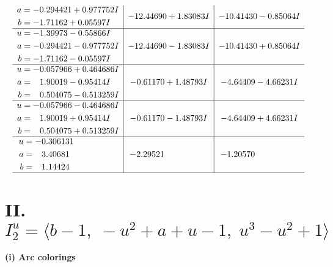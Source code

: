 \documentclass[1p]{elsarticle_modified}
\theoremstyle{definition}
\begin{document}
$$\begin{array}{c|c|c}
\begin{aligned}
a &= -0.294421 + 0.977752 I \\
b &= -1.71162 + 0.05597 I\end{aligned}
 & -12.44690 + 1.83083 I & -10.41430 - 0.85064 I \\ \hline\begin{aligned}
u &= -1.39973 - 0.55866 I \\
a &= -0.294421 - 0.977752 I \\
b &= -1.71162 - 0.05597 I\end{aligned}
 & -12.44690 - 1.83083 I & -10.41430 + 0.85064 I \\ \hline\begin{aligned}
u &= -0.057966 + 0.464686 I \\
a &= \phantom{-}1.90019 - 0.95414 I \\
b &= \phantom{-}0.504075 - 0.513259 I\end{aligned}
 & -0.61170 + 1.48793 I & -4.64409 - 4.66231 I \\ \hline\begin{aligned}
u &= -0.057966 - 0.464686 I \\
a &= \phantom{-}1.90019 + 0.95414 I \\
b &= \phantom{-}0.504075 + 0.513259 I\end{aligned}
 & -0.61170 - 1.48793 I & -4.64409 + 4.66231 I \\ \hline\begin{aligned}
u &= -0.306131\phantom{ +0.000000I} \\
a &= \phantom{-}3.40681\phantom{ +0.000000I} \\
b &= \phantom{-}1.14424\phantom{ +0.000000I}\end{aligned}
 & -2.29521\phantom{ +0.000000I} & -1.20570\phantom{ +0.000000I}\\
 \hline 
 \end{array}$$\newpage\newpage\renewcommand{\arraystretch}{1}
\centering \section*{II. $I^u_{2}= \langle b-1,\;- u^2+a+u-1,\;u^3- u^2+1 \rangle$}
\flushleft \textbf{(i) Arc colorings}\\
\end{document}
